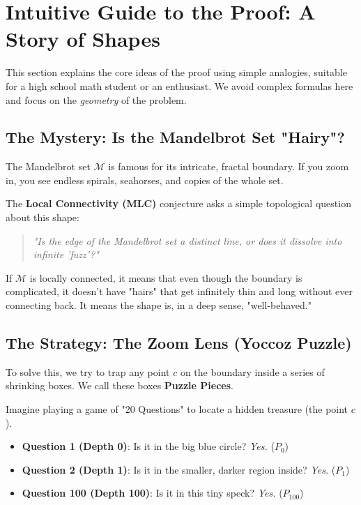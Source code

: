 \section{Intuitive Guide to the Proof: A Story of Shapes}
\label{sec:IntuitiveExplanation}

This section explains the core ideas of the proof using simple analogies, suitable for a high school math student or an enthusiast. We avoid complex formulas here and focus on the \emph{geometry} of the problem.

\subsection{The Mystery: Is the Mandelbrot Set "Hairy"?}

The Mandelbrot set $\mathcal{M}$ is famous for its intricate, fractal boundary. If you zoom in, you see endless spirals, seahorses, and copies of the whole set.

The \textbf{Local Connectivity (MLC)} conjecture asks a simple topological question about this shape:
\begin{quote}
    \emph{"Is the edge of the Mandelbrot set a distinct line, or does it dissolve into infinite 'fuzz'?"}
\end{quote}

If $\mathcal{M}$ is locally connected, it means that even though the boundary is complicated, it doesn't have "hairs" that get infinitely thin and long without ever connecting back. It means the shape is, in a deep sense, "well-behaved."

\subsection{The Strategy: The Zoom Lens (Yoccoz Puzzle)}

To solve this, we try to trap any point $c$ on the boundary inside a series of shrinking boxes. We call these boxes \textbf{Puzzle Pieces}.

Imagine playing a game of "20 Questions" to locate a hidden treasure (the point $c$).
\begin{itemize}
    \item \textbf{Question 1 (Depth 0)}: Is it in the big blue circle? \emph{Yes.} ($P_0$)
    \item \textbf{Question 2 (Depth 1)}: Is it in the smaller, darker region inside? \emph{Yes.} ($P_1$)
    \item \textbf{Question 100 (Depth 100)}: Is it in this tiny speck? \emph{Yes.} ($P_{100}$)
\end{itemize}

